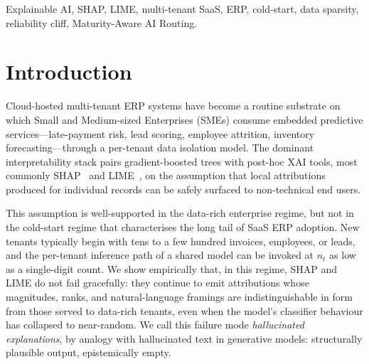\documentclass[conference]{IEEEtran}
\newcommand{\nT}{n_t}
\begin{document}
\begin{IEEEkeywords}
Explainable AI, SHAP, LIME, multi-tenant SaaS, ERP, cold-start, data
sparsity, reliability cliff, Maturity-Aware AI Routing.
\end{IEEEkeywords}

\section{Introduction}
\label{sec:intro}

Cloud-hosted multi-tenant ERP systems have become a routine substrate on
which Small and Medium-sized Enterprises (SMEs) consume embedded
predictive services---late-payment risk, lead scoring, employee attrition,
inventory forecasting---through a per-tenant data isolation model.
The dominant interpretability stack pairs gradient-boosted trees with
post-hoc XAI tools, most commonly SHAP~\cite{lundberg2017unified,
lundberg2020local} and LIME~\cite{ribeiro2016why}, on the assumption that
local attributions produced for individual records can be safely surfaced
to non-technical end users.

This assumption is well-supported in the data-rich enterprise regime, but
not in the cold-start regime that characterises the long tail of SaaS ERP
adoption. New tenants typically begin with tens to a few hundred
invoices, employees, or leads, and the per-tenant inference path of a
shared model can be invoked at $\nT$ as low as a single-digit count. We
show empirically that, in this regime, SHAP and LIME do not fail
gracefully: they continue to emit attributions whose magnitudes, ranks,
and natural-language framings are indistinguishable in form from those
served to data-rich tenants, even when the model's classifier behaviour
has collapsed to near-random. We call this failure mode
\emph{hallucinated explanations}, by analogy with hallucinated text in
generative models: structurally plausible output, epistemically empty.
\end{document}

